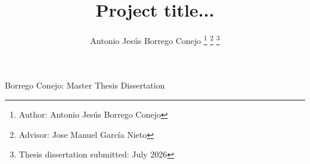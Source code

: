 \documentclass[journal,onecolumn]{IEEEtran}
\begin{document}
%
\title{Project title...}
%
%
%

\author{Antonio Jes\'{u}s Borrego Conejo%
\thanks{Author: Antonio Jes\'{u}s Borrego Conejo}%
\thanks{Advisor: Jose Manuel Garc\'{i}a Nieto}%
\thanks{Thesis dissertation submitted: July 2026}}

% 
%



%
{Borrego Conejo: Master Thesis Dissertation}
% 
\end{document}
